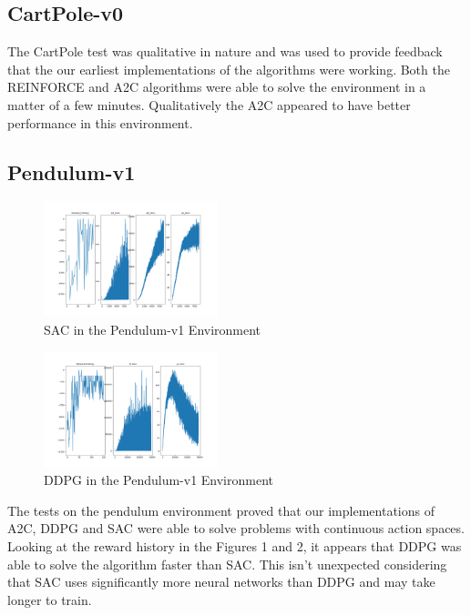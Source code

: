 \documentclass[conference]{IEEEtran}
\begin{document}
\subsection{CartPole-v0}

The CartPole test was qualitative in nature and was used to provide feedback that the our earliest implementations of the algorithms were working. Both the REINFORCE and A2C algorithms were able to solve the environment in a matter of a few minutes. Qualitatively the A2C appeared to have better performance in this environment.

\subsection{Pendulum-v1}

\begin{figure}
    \includegraphics[width=0.45\textwidth]{sac-pendulum}
    \caption{SAC in the Pendulum-v1 Environment}
\end{figure}

\begin{figure}
    \includegraphics[width=0.45\textwidth]{ddpg-pendulum}
    \caption{DDPG in the Pendulum-v1 Environment}
\end{figure}

The tests on the pendulum environment proved that our implementations of A2C, DDPG and SAC were able to solve problems with continuous action spaces. Looking at the reward history in the Figures 1 and 2, it appears that DDPG was able to solve the algorithm faster than SAC. This isn't unexpected considering that SAC uses significantly more neural networks than DDPG and may take longer to train.
\end{document}
